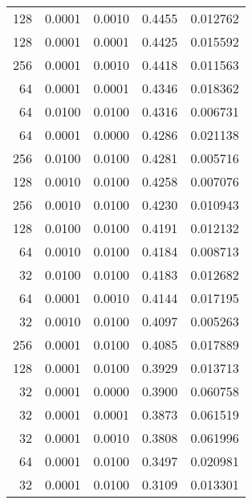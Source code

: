 \begin{tabular}{rrrrr}
 128 &  0.0001 &  0.0010 &  0.4455 &  0.012762 \\
 128 &  0.0001 &  0.0001 &  0.4425 &  0.015592 \\
 256 &  0.0001 &  0.0010 &  0.4418 &  0.011563 \\
  64 &  0.0001 &  0.0001 &  0.4346 &  0.018362 \\
  64 &  0.0100 &  0.0100 &  0.4316 &  0.006731 \\
  64 &  0.0001 &  0.0000 &  0.4286 &  0.021138 \\
 256 &  0.0100 &  0.0100 &  0.4281 &  0.005716 \\
 128 &  0.0010 &  0.0100 &  0.4258 &  0.007076 \\
 256 &  0.0010 &  0.0100 &  0.4230 &  0.010943 \\
 128 &  0.0100 &  0.0100 &  0.4191 &  0.012132 \\
  64 &  0.0010 &  0.0100 &  0.4184 &  0.008713 \\
  32 &  0.0100 &  0.0100 &  0.4183 &  0.012682 \\
  64 &  0.0001 &  0.0010 &  0.4144 &  0.017195 \\
  32 &  0.0010 &  0.0100 &  0.4097 &  0.005263 \\
 256 &  0.0001 &  0.0100 &  0.4085 &  0.017889 \\
 128 &  0.0001 &  0.0100 &  0.3929 &  0.013713 \\
  32 &  0.0001 &  0.0000 &  0.3900 &  0.060758 \\
  32 &  0.0001 &  0.0001 &  0.3873 &  0.061519 \\
  32 &  0.0001 &  0.0010 &  0.3808 &  0.061996 \\
  64 &  0.0001 &  0.0100 &  0.3497 &  0.020981 \\
  32 &  0.0001 &  0.0100 &  0.3109 &  0.013301 \\
\bottomrule
\end{tabular}
